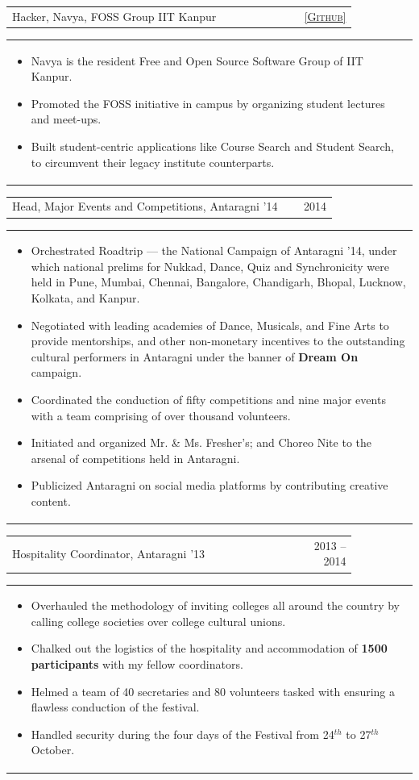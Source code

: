 \documentclass[a4paper,10pt]{article} %
\newcommand{\iproject}[3]{
    \begin{tabular}{p{0.85\linewidth}r}
        \textcolor{NavyBlue}{#2} & \multicolumn{1}{m{3cm}}{\raggedleft \textsc{#1}}\\
    \end{tabular}
    \begin{tabular}{p{\linewidth}}
    \vspace{-0.3cm}
        \footnotesize{#3}
    \end{tabular}
    \vspace{-0.5cm}
}
\begin{document}
\iproject {\href{https://github.com/navya} {[Github]} }
          {Hacker, Navya, FOSS Group IIT Kanpur}
          {
               \begin{itemize}[leftmargin=0.5cm]
                   \item Navya is the resident Free and Open Source Software Group of IIT Kanpur.
                   \item Promoted the FOSS initiative in campus by organizing student lectures and meet-ups.
                   \item Built student-centric applications like Course Search and Student Search, to circumvent
                       their legacy institute counterparts.
               \end{itemize}
          }

\iproject {2014}
          {Head, Major Events and Competitions, Antaragni '14}
          {
               \begin{itemize}[leftmargin=0.5cm]
                    \item Orchestrated Roadtrip --- the National Campaign of Antaragni '14, under which national prelims for Nukkad,
                        Dance, Quiz and Synchronicity were held in Pune, Mumbai, Chennai, Bangalore, Chandigarh, Bhopal, Lucknow,
                        Kolkata, and Kanpur.
                    \item Negotiated with leading academies of Dance, Musicals, and Fine Arts to provide mentorships, and other
                        non-monetary incentives to the outstanding cultural performers in Antaragni under the banner
                        of \textbf{Dream On} campaign.
                    \item Coordinated the conduction of fifty competitions and nine major events with a team comprising of over
                        thousand volunteers.
                    \item Initiated and organized Mr. \& Ms. Fresher's; and Choreo Nite to the arsenal of competitions
                        held in Antaragni.
                    \item Publicized Antaragni on social media platforms by contributing creative content.
               \end{itemize}
          }

\iproject {2013 -- 2014}
          {Hospitality Coordinator, Antaragni '13}
          {
               \begin{itemize}[leftmargin=0.5cm]
                   \item Overhauled the methodology of inviting colleges all around the country by calling college societies over college cultural unions.
                   \item Chalked out the logistics of the hospitality and accommodation of \textbf{1500 participants} with my fellow coordinators.
                   \item Helmed a team of 40 secretaries and 80 volunteers tasked with ensuring a flawless conduction of the festival.
                   \item Handled security during the four days of the Festival from 24$^{th}$ to 27$^{th}$ October.
               \end{itemize}
          }
\end{document}
